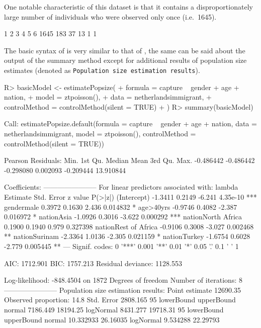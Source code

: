 \documentclass[nojss]{jss}
\newcommand{\1}{\mathcal{I}} \newcommand{\bZero}{\boldsymbol{0}}
\begin{document}
One notable characteristic of this dataset is that it contains a
disproportionately large number of individuals who were observed only
once (i.e.~1645).

\begin{CodeChunk}
\begin{CodeOutput}

   1    2    3    4    5    6
1645  183   37   13    1    1
\end{CodeOutput}
\end{CodeChunk}

The basic syntax of  is very similar to that of
, the same can be said about the output of the summary method
except for additional results of population size estimates (denoted as
\texttt{Population size estimation results}).

\begin{CodeChunk}
\begin{CodeInput}
R> basicModel <- estimatePopsize(
+   formula = capture ~ gender + age + nation,
+   model   = ztpoisson(),
+   data    = netherlandsimmigrant,
+   controlMethod = controlMethod(silent = TRUE)
+ )
R> summary(basicModel)
\end{CodeInput}
\begin{CodeOutput}

Call:
estimatePopsize.default(formula = capture ~ gender + age + nation,
    data = netherlandsimmigrant, model = ztpoisson(), controlMethod = controlMethod(silent = TRUE))

Pearson Residuals:
     Min.   1st Qu.    Median      Mean   3rd Qu.      Max.
-0.486442 -0.486442 -0.298080  0.002093 -0.209444 13.910844

Coefficients:
-----------------------
For linear predictors associated with: lambda
                     Estimate Std. Error z value  P(>|z|)
(Intercept)           -1.3411     0.2149  -6.241 4.35e-10 ***
gendermale             0.3972     0.1630   2.436 0.014832 *
age>40yrs             -0.9746     0.4082  -2.387 0.016972 *
nationAsia            -1.0926     0.3016  -3.622 0.000292 ***
nationNorth Africa     0.1900     0.1940   0.979 0.327398
nationRest of Africa  -0.9106     0.3008  -3.027 0.002468 **
nationSurinam         -2.3364     1.0136  -2.305 0.021159 *
nationTurkey          -1.6754     0.6028  -2.779 0.005445 **
---
Signif. codes:  0 '***' 0.001 '**' 0.01 '*' 0.05 '.' 0.1 ' ' 1

AIC: 1712.901
BIC: 1757.213
Residual deviance: 1128.553

Log-likelihood: -848.4504 on 1872 Degrees of freedom
Number of iterations: 8
-----------------------
Population size estimation results:
Point estimate 12690.35
Observed proportion: 14.8%
Std. Error 2808.165
95%
          lowerBound upperBound
normal      7186.449   18194.25
logNormal   8431.277   19718.31
95%
          lowerBound upperBound
normal     10.332933   26.16035
logNormal   9.534288   22.29793
\end{CodeOutput}
\end{CodeChunk}
\end{document}
